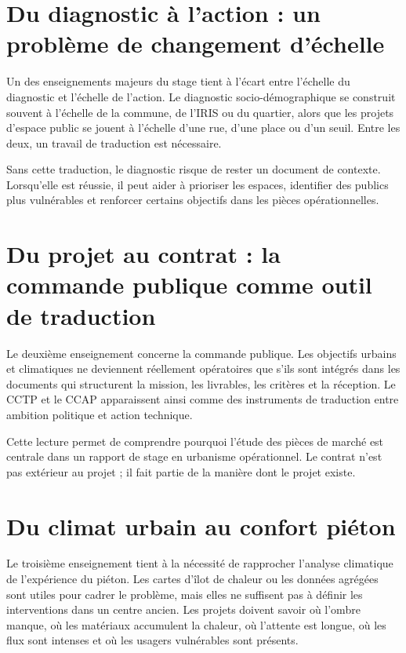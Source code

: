 \documentclass[11pt,a4paper]{report}
\begin{document}
\section{Du diagnostic à l'action : un problème de changement d'échelle}

Un des enseignements majeurs du stage tient à l'écart entre l'échelle du diagnostic et l'échelle de l'action. Le diagnostic socio-démographique se construit souvent à l'échelle de la commune, de l'IRIS ou du quartier, alors que les projets d'espace public se jouent à l'échelle d'une rue, d'une place ou d'un seuil. Entre les deux, un travail de traduction est nécessaire.

Sans cette traduction, le diagnostic risque de rester un document de contexte. Lorsqu'elle est réussie, il peut aider à prioriser les espaces, identifier des publics plus vulnérables et renforcer certains objectifs dans les pièces opérationnelles.

\section{Du projet au contrat : la commande publique comme outil de traduction}

Le deuxième enseignement concerne la commande publique. Les objectifs urbains et climatiques ne deviennent réellement opératoires que s'ils sont intégrés dans les documents qui structurent la mission, les livrables, les critères et la réception. Le CCTP et le CCAP apparaissent ainsi comme des instruments de traduction entre ambition politique et action technique.

Cette lecture permet de comprendre pourquoi l'étude des pièces de marché est centrale dans un rapport de stage en urbanisme opérationnel. Le contrat n'est pas extérieur au projet ; il fait partie de la manière dont le projet existe.

\section{Du climat urbain au confort piéton}

Le troisième enseignement tient à la nécessité de rapprocher l'analyse climatique de l'expérience du piéton. Les cartes d'îlot de chaleur ou les données agrégées sont utiles pour cadrer le problème, mais elles ne suffisent pas à définir les interventions dans un centre ancien. Les projets doivent savoir où l'ombre manque, où les matériaux accumulent la chaleur, où l'attente est longue, où les flux sont intenses et où les usagers vulnérables sont présents.
\end{document}

